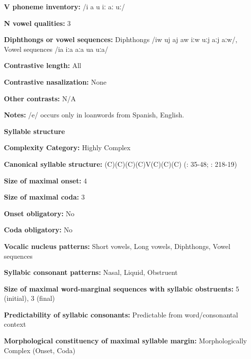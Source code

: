 \textbf{V phoneme inventory:} /i a u iː aː uː/



\textbf{N vowel qualities:} 3



\textbf{Diphthongs or vowel sequences:} Diphthongs /iw uj aj aw iːw uːj aːj aːw/, Vowel sequences /ia iːa aːa ua uːa/



\textbf{Contrastive length:} All



\textbf{Contrastive nasalization:} None



\textbf{Other contrasts:} N/A



\textbf{Notes:} /e/ occurs only in loanwords from Spanish, English.



\textbf{Syllable structure}



\textbf{Complexity Category:} Highly Complex



\textbf{Canonical syllable structure:} (C)(C)(C)(C)V(C)(C)(C) (\citealt{Crawford1966}: 35-48; \citealt{Bendixen1980}: 218-19)



\textbf{Size of maximal onset:} 4



\textbf{Size of maximal coda:} 3



\textbf{Onset obligatory:} No



\textbf{Coda obligatory:} No



\textbf{Vocalic nucleus patterns:} Short vowels, Long vowels, Diphthongs, Vowel sequences



\textbf{Syllabic consonant patterns:} Nasal, Liquid, Obstruent



\textbf{Size of maximal word{}-marginal sequences with syllabic obstruents:} 5 (initial), 3 (final)



\textbf{Predictability of syllabic consonants:} Predictable from word/consonantal context



\textbf{Morphological constituency of maximal syllable margin:} Morphologically Complex (Onset, Coda)



